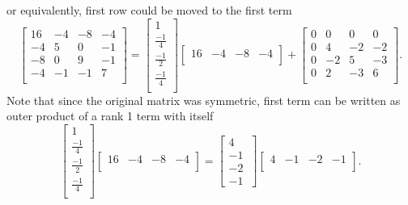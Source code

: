 \documentclass[11pt]{article}
\begin{document}
or equivalently, first row could be moved to the first term
\begin{equation*}
\left[
\begin{matrix}
16 & -4 & -8 & -4 \\
-4 & 5 & 0 & -1 \\
-8 & 0 & 9 & -1\\
-4 & -1 & -1 & 7\\
\end{matrix}
\right] = 
\left[
\begin{matrix}
1\\
\frac{-1}{4}\\
\frac{-1}{2}\\
\frac{-1}{4}\\
\end{matrix}
\right]
\left[
\begin{matrix}
16& -4 & -8 & -4\\
\end{matrix}
\right] + 
\left[
\begin{matrix}
0 & 0 & 0 & 0 \\
0 & 4 & -2 & -2 \\
0 & -2 & 5 & -3\\
0 & 2 & -3 & 6\\
\end{matrix}
\right].
\end{equation*}
Note that since the original matrix was symmetric, first term can be written as outer product of a rank 1 term with itself
\begin{equation*}
\left[
\begin{matrix}
1\\
\frac{-1}{4}\\
\frac{-1}{2}\\
\frac{-1}{4}\\
\end{matrix}
\right]
\left[
\begin{matrix}
16& -4 & -8 & -4\\
\end{matrix}
\right]
 = 
 \left[
 \begin{matrix}
4\\
-1\\
-2\\
-1\
\end{matrix}
\right]
\left[
\begin{matrix}
4& -1 & -2 & -1\\
\end{matrix}
\right].
\end{equation*}
\end{document}

